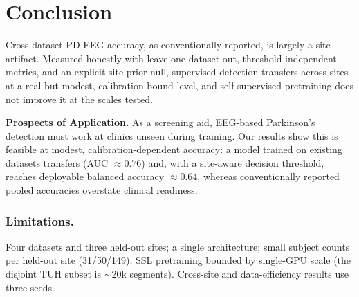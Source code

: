 \documentclass[runningheads]{llncs}
\begin{document}
\section{Conclusion}
Cross-dataset PD-EEG accuracy, as conventionally reported, is largely a site artifact. Measured honestly with leave-one-dataset-out, threshold-independent metrics, and an explicit site-prior null, supervised detection transfers across sites at a real but modest, calibration-bound level, and self-supervised pretraining does not improve it at the scales tested.

\noindent\textbf{Prospects of Application.} As a screening aid, EEG-based Parkinson's detection must work at clinics unseen during training. Our results show this is feasible at modest, calibration-dependent accuracy: a model trained on existing datasets transfers (AUC $\approx 0.76$) and, with a site-aware decision threshold, reaches deployable balanced accuracy $\approx 0.64$, whereas conventionally reported pooled accuracies overstate clinical readiness.

\subsubsection*{Limitations.}
Four datasets and three held-out sites; a single architecture; small subject counts per held-out site (31/50/149); SSL pretraining bounded by single-GPU scale (the disjoint TUH subset is $\sim$20k segments). Cross-site and data-efficiency results use three seeds.



\end{document}
